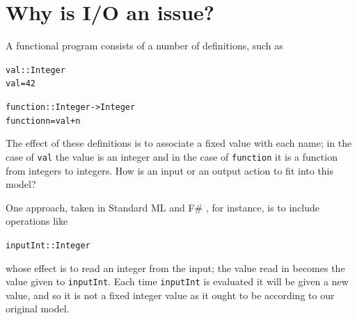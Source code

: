


\section{Why is I/O an issue?}
\label{ioCaution}

A functional program consists of a number of definitions, such as
\begin{alltt}
val :: Integer
val = 42

function :: Integer -> Integer
function n = val + n
\end{alltt}
The effect of these definitions is to associate a fixed value with each
name; in the case of \texttt{val} the value is an integer and in the case of
\texttt{function} it is a function from integers to integers.
How is an input or an output action to fit
into this model? 

One approach, taken in Standard ML  and F\# \cite{Fsharp}, for instance,
is to include operations like
\begin{alltt}
inputInt :: Integer
\end{alltt}
whose effect is to read an integer from the input; the value read in becomes the value 
given to \texttt{inputInt}.
Each time \texttt{inputInt} is evaluated it will be given a new value, 
and so it is not a fixed integer value as it ought to
be according to our original model.

